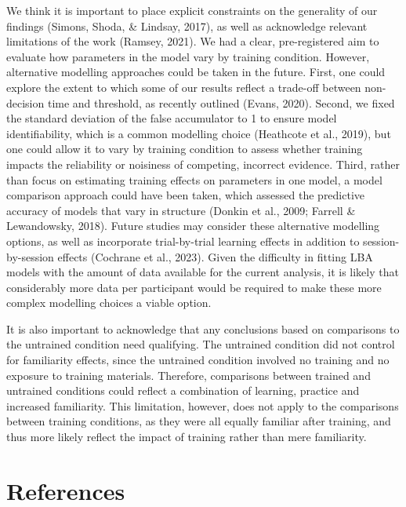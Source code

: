\documentclass[
  english,
  man, donotrepeattitle,floatsintext]{apa6}
\begin{document}
We think it is important to place explicit constraints on the generality of our findings (Simons, Shoda, \& Lindsay, 2017), as well as acknowledge relevant limitations of the work (Ramsey, 2021). We had a clear, pre-registered aim to evaluate how parameters in the model vary by training condition. However, alternative modelling approaches could be taken in the future. First, one could explore the extent to which some of our results reflect a trade-off between non-decision time and threshold, as recently outlined (Evans, 2020). Second, we fixed the standard deviation of the false accumulator to 1 to ensure model identifiability, which is a common modelling choice (Heathcote et al., 2019), but one could allow it to vary by training condition to assess whether training impacts the reliability or noisiness of competing, incorrect evidence. Third, rather than focus on estimating training effects on parameters in one model, a model comparison approach could have been taken, which assessed the predictive accuracy of models that vary in structure (Donkin et al., 2009; Farrell \& Lewandowsky, 2018). Future studies may consider these alternative modelling options, as well as incorporate trial-by-trial learning effects in addition to session-by-session effects (Cochrane et al., 2023). Given the difficulty in fitting LBA models with the amount of data available for the current analysis, it is likely that considerably more data per participant would be required to make these more complex modelling choices a viable option.

It is also important to acknowledge that any conclusions based on comparisons to the untrained condition need qualifying. The untrained condition did not control for familiarity effects, since the untrained condition involved no training and no exposure to training materials. Therefore, comparisons between trained and untrained conditions could reflect a combination of learning, practice and increased familiarity. This limitation, however, does not apply to the comparisons between training conditions, as they were all equally familiar after training, and thus more likely reflect the impact of training rather than mere familiarity.

\newpage

\section{References}\label{references}
\end{document}
